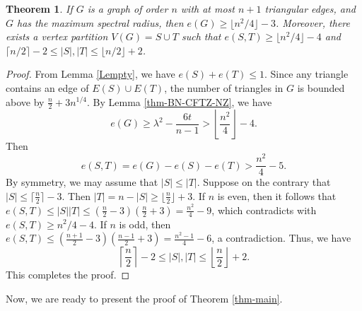 \documentclass[11pt]{article}
\newtheorem{theorem}{Theorem}[section]
\begin{document}
\begin{theorem}\label{STlambdarefine}
If $G$ is a graph of order $n$ with 
at most $n+1$ triangular edges, and $G$ has the maximum spectral radius, then 
$e(G)\ge \lfloor {n^2}/{4} \rfloor -3 $. 
Moreover, 
 there exists a vertex partition $V(G)=S\cup T$ such that  
$e(S,T)\ge \lfloor n^2/4 \rfloor -4$ and 
$\lceil {n}/{2} \rceil -2
\le |S|,  |T|\le \lfloor {n}/{2} \rfloor +2$. 
\end{theorem}


\begin{proof}
 From Lemma \ref{Lempty}, 
  we have $e(S) + e(T) \leq 1$.
  Since any triangle contains an  edge of  $E(S)\cup E(T)$, 
  the number of triangles in $G$ is bounded above by $\frac{n}{2} +3n^{1/4}$. 
       By Lemma \ref{thm-BN-CFTZ-NZ},
       we have $$e(G) \geq \lambda^2-\frac{6t}{n-1}> 
       \left\lfloor \frac{n^2}{4}  \right \rfloor-4.$$
Then 
\[ e(S,T) = e(G) - e(S) - e(T) > \frac{n^2}{4} -5. \]
By symmetry, we may assume that $|S| \le |T|$. 
       Suppose on the contrary  that $|S|\le \lceil \frac{n}{2} \rceil -3$.  Then $|T|=n-|S|\ge \lfloor \frac{n}{2} \rfloor +3$. 
       If $n$ is even, then it follows that 
       $e(S,T)\le  |S||T|\le  \left (\frac{n}{2}-3 \right) \left(\frac{n}{2}+3 \right)= \frac{n^2}{4}-9$, 
        which contradicts with $e(S,T)\ge {n^2}/{4} - 4$. 
        If $n$ is odd, then $e(S,T)\le (\frac{n+1}{2}-3)(\frac{n-1}{2} +3) =\frac{n^2-1}{4} -6$, a contradiction. 
        Thus, we have
        \[   \left\lceil \frac{n}{2} \right\rceil -2
\le |S|, |T|\le  \left\lfloor \frac{n}{2} \right\rfloor +2. \] 
This completes the proof. 
\end{proof}


Now, we are ready to present the proof of Theorem \ref{thm-main}. 
\end{document}
